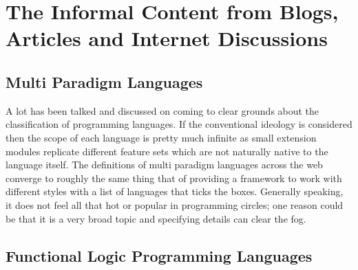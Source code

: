 \documentclass[thesis-solanki.tex]{subfiles}
\begin{document}
\section{The Informal Content from Blogs, Articles and Internet Discussions}
  
\subsection{Multi Paradigm Languages}

  A lot has been talked and discussed on coming to clear grounds about the classification of programming languages.
  If the conventional ideology is considered then the scope of each language is pretty much infinite as small
  extension modules replicate different feature sets which are not naturally native to the language itself.
  The definitions of multi paradigm languages across the web
  \cite{website:wikimultiparadigm,website:mdn,website:blogc2} converge to roughly the same thing that of providing
  a framework to work with different styles with a list of languages \cite{website:wikimpllist,website:dmoz} that
  ticks the boxes.
  Generally speaking, it does not feel all that hot or popular in programming circles; one reason could be that it
  is a very broad topic and specifying details can clear the fog.

\begin{comment}
\begin{enumerate}
\item Wikipedia Multiparadigm Programming Languages
\\* \url{http://en.wikipedia.org/wiki/Multi-paradigm_programming_language#Multi-paradigm}
\\* \url{http://en.wikipedia.org/wiki/List_of_programming_languages_by_type#Multiparadigm_languages}

\item Mozilla Developer Network MDN,
\\* \url{https://developer.mozilla.org/en-US/docs/multiparadigmlanguage.html}

\item Some blog called c2,
\\* \url{http://c2.com/cgi/wiki?MultiParadigmProgrammingLanguage} 
\end{enumerate}
\end{comment}

\subsection{Functional Logic Programming Languages}
\end{document}
